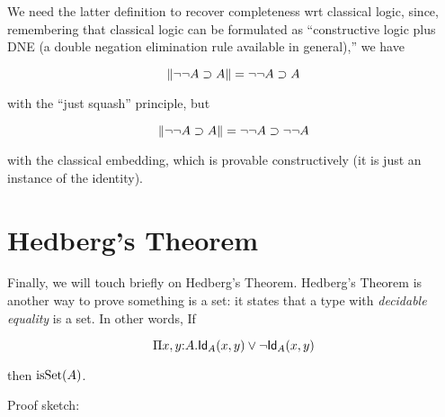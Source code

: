 \documentclass[11pt]{article}
\begin{document}
We need the latter definition to recover completeness wrt classical logic,
since, remembering that classical logic can be formulated as ``constructive
logic plus DNE (a double negation elimination rule available in general),''
we have

\[
{\parallel}{\lnot\lnot A\supset A}{\parallel} = \lnot\lnot A\supset A
\]

with the ``just squash'' principle, but

\[
{\parallel}{\lnot\lnot A\supset A}{\parallel} = \lnot\lnot A\supset \lnot\lnot A
\]

with the classical embedding, which is provable constructively (it is just
an instance of the identity).


\section{Hedberg's Theorem}

Finally, we will touch briefly on Hedberg's Theorem.
Hedberg's Theorem is another way to prove something is a set: it states
that a type with {\em decidable equality} is a set. In other words, If

\[
\Pi{x,y}{:}A.\mathsf{Id}_{A}(x,y) \lor \lnot\mathsf{Id}_{A}(x,y)
\]

then $\operatorname{isSet}(A)$.

Proof sketch: %
\end{document}
